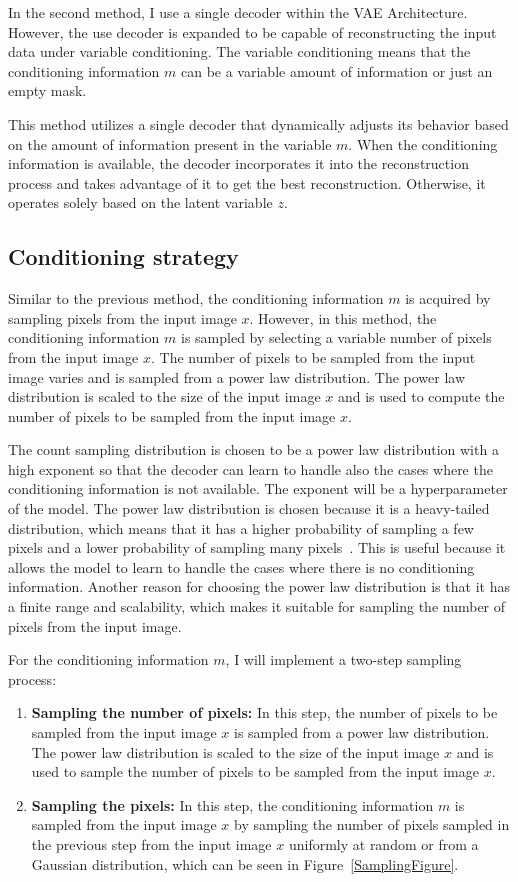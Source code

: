 In the second method, I use a single decoder within the VAE Architecture.
However, the use decoder is expanded to be capable of reconstructing the input
data under variable conditioning. The variable conditioning means that the
conditioning information $m$ can be a variable amount of information or just an
empty mask.

This method utilizes a single decoder that dynamically adjusts its behavior
based on the amount of information present in the variable $m$. When the
conditioning information is available, the decoder incorporates it into the
reconstruction process and takes advantage of it to get the best
reconstruction. Otherwise, it operates solely based on the latent variable $z$.

\subsection{Conditioning strategy}

Similar to the previous method, the conditioning information $m$ is acquired by sampling pixels from the input image $x$. However, in this method, the conditioning information $m$ is sampled by selecting a variable number of pixels from the input image $x$. The number of pixels to be sampled from the input image varies and is sampled from a power law distribution. The power law distribution is scaled to the size of the input image $x$ and is used to compute the number of pixels to be sampled from the input image $x$.

The count sampling distribution is chosen to be a power law distribution with a high exponent so that the decoder can learn to handle also the cases where the conditioning information is not available. The exponent will be a hyperparameter of the model. The power law distribution is chosen because it is a heavy-tailed distribution, which means that it has a higher probability of sampling a few pixels and a lower probability of sampling many pixels~\cite{powerlaw}. This is useful because it allows the model to learn to handle the cases where there is no conditioning information. Another reason for choosing the power law distribution is that it has a finite range and scalability, which makes it suitable for sampling the number of pixels from the input image.

For the conditioning information $m$, I will implement a two-step sampling process:

\begin{enumerate}
    \item \textbf{Sampling the number of pixels:} In this step, the number of pixels to be sampled from the input image $x$ is sampled from a power law distribution. The power law distribution is scaled to the size of the input image $x$ and is used to sample the number of pixels to be sampled from the input image $x$.
    \item \textbf{Sampling the pixels:} In this step, the conditioning information $m$ is sampled from the input image $x$ by sampling the number of pixels sampled in the previous step from the input image $x$ uniformly at random or from a Gaussian distribution, which can be seen in Figure~\ref{SamplingFigure}.
\end{enumerate}

